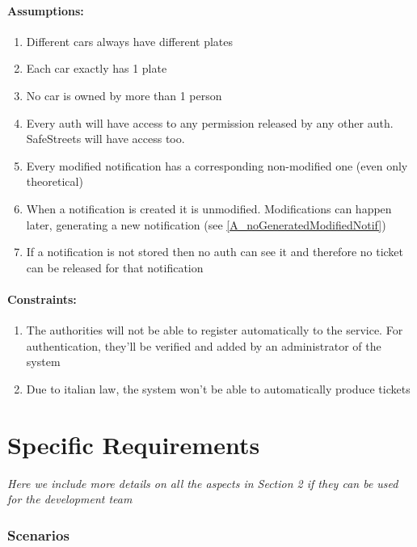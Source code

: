 \documentclass{article}
\newcommand{\enum}[1]{\texttt{#1.\arabic*}}
\begin{document}
	\paragraph{Assumptions:}
		\begin{enumerate}[label=\enum{A}]
			\item \label{A_disjPlates} Different cars always have different plates
			\item \label{A_Single plate}Each car exactly has 1 plate
			\item \label{A_singleOwner}No car is owned by more than 1 person
			\item \label{A_accessiblePermissions}Every auth will have access to any permission released by any other auth. SafeStreets will have access too.
			\item \label{A_noGeneratedModifiedNotif}Every modified notification has a corresponding non-modified one (even only theoretical)
			\item \label{A_newNotificationsAreNotModified}When a notification is created it is unmodified. Modifications can happen later, generating a new notification (see \ref{A_noGeneratedModifiedNotif})
			\item \label{A_authsNotClairvoyants}If a notification is not stored then no auth can see it and therefore no ticket can be released for that notification
		\end{enumerate}
	
	\paragraph{Constraints:}
		\begin{enumerate}[label=\enum{C}]
			\item The authorities will not be able to register automatically to the service. For authentication, they'll be verified and added by an administrator of the system
			\item \label{C_noAutoTickets}Due to italian law, the system won't be able to automatically produce tickets
		\end{enumerate}
	
\newpage
\section{Specific Requirements} \textit{Here we include more details on all the aspects in Section 2 if they can be used for the development team}

		\subsubsection{Scenarios}
		
\end{document}
